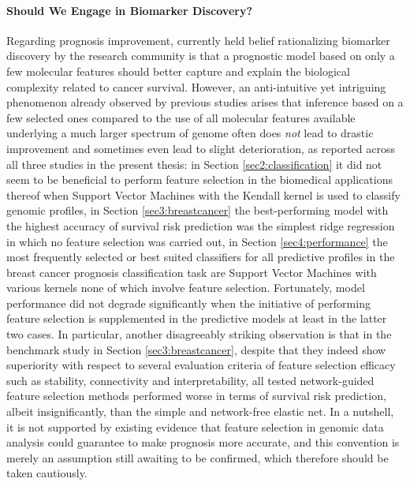 \paragraph{Should We Engage in Biomarker Discovery?} Regarding prognosis improvement, currently held belief rationalizing biomarker discovery by the research community is that a prognostic model based on only a few molecular features should better capture and explain the biological complexity related to cancer survival. However, an anti-intuitive yet intriguing phenomenon already observed by previous studies \cite{Haury2011influence} arises that inference based on a few selected ones compared to the use of all molecular features available underlying a much larger spectrum of genome often does \emph{not} lead to drastic improvement and sometimes even lead to slight deterioration, as reported across all three studies in the present thesis: in Section \ref{sec2:classification} it did not seem to be beneficial to perform feature selection in the biomedical applications thereof when Support Vector Machines with the Kendall kernel is used to classify genomic profiles, in Section \ref{sec3:breastcancer} the best-performing model with the highest accuracy of survival risk prediction was the simplest ridge regression in which no feature selection was carried out, in Section \ref{sec4:performance} the most frequently selected or best suited classifiers for all predictive profiles in the breast cancer prognosis classification task are Support Vector Machines with various kernels none of which involve feature selection. Fortunately, model performance did not degrade significantly when the initiative of performing feature selection is supplemented in the predictive models at least in the latter two cases. In particular, another disagreeably striking observation is that in the benchmark study in Section \ref{sec3:breastcancer}, despite that they indeed show superiority with respect to several evaluation criteria of feature selection efficacy such as stability, connectivity and interpretability, all tested network-guided feature selection methods performed worse in terms of survival risk prediction, albeit insignificantly, than the simple and network-free elastic net. In a nutshell, it is not supported by existing evidence that feature selection in genomic data analysis could guarantee to make prognosis more accurate, and this convention is merely an assumption still awaiting to be confirmed, which therefore should be taken cautiously.


